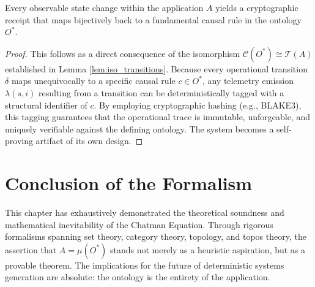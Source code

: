\begin{corollary}
\label{cor:crypto_truth}
Every observable state change within the application $A$ yields a cryptographic receipt that maps bijectively back to a fundamental causal rule in the ontology $O^*$.
\end{corollary}

\begin{proof}
This follows as a direct consequence of the isomorphism $\mathcal{C}(O^*) \cong \mathcal{T}(A)$ established in Lemma \ref{lem:iso_transitions}. Because every operational transition $\delta$ maps unequivocally to a specific causal rule $c \in O^*$, any telemetry emission $\lambda(s, i)$ resulting from a transition can be deterministically tagged with a structural identifier of $c$. By employing cryptographic hashing (e.g., BLAKE3), this tagging guarantees that the operational trace is immutable, unforgeable, and uniquely verifiable against the defining ontology. The system becomes a self-proving artifact of its own design.
\end{proof}

\section{Conclusion of the Formalism}

This chapter has exhaustively demonstrated the theoretical soundness and mathematical inevitability of the Chatman Equation. Through rigorous formalisms spanning set theory, category theory, topology, and topos theory, the assertion that $A = \mu(O^*)$ stands not merely as a heuristic aspiration, but as a provable theorem. The implications for the future of deterministic systems generation are absolute: the ontology is the entirety of the application.
